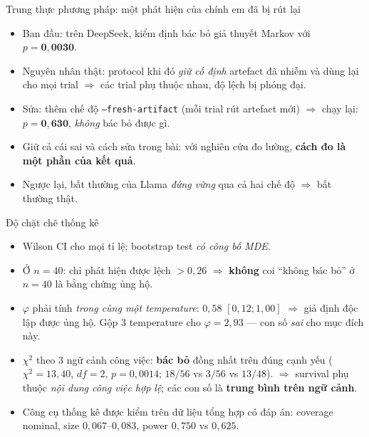 \documentclass[aspectratio=169,11pt]{beamer}
\begin{document}
\begin{frame}{Trung thực phương pháp: một phát hiện của chính em đã bị rút lại}
  \begin{itemize}
    \item Ban đầu: trên DeepSeek, kiểm định bác bỏ giả thuyết Markov với
          $p=\mathbf{0{,}0030}$.
    \item Nguyên nhân thật: protocol khi đó \emph{giữ cố định} artefact đã nhiễm và dùng
          lại cho mọi trial $\Rightarrow$ các trial phụ thuộc nhau, độ lệch bị phóng đại.
    \item Sửa: thêm chế độ \texttt{--fresh-artifact} (mỗi trial rút artefact mới)
          $\Rightarrow$ chạy lại: $p=\mathbf{0{,}630}$, \emph{không} bác bỏ được gì.
    \item Giữ cả cái sai và cách sửa trong bài: với nghiên cứu đo lường,
          \textbf{cách đo là một phần của kết quả}.
    \item Ngược lại, bất thường của Llama \emph{đứng vững} qua cả hai chế độ
          $\Rightarrow$ bất thường thật.
  \end{itemize}
\end{frame}

\begin{frame}{Độ chặt chẽ thống kê}
  \begin{itemize}
    \item Wilson CI cho mọi tỉ lệ; bootstrap test \emph{có công bố MDE}.
    \item Ở $n=40$: chỉ phát hiện được lệch $>0{,}26$ $\Rightarrow$ \textbf{không} coi
          ``không bác bỏ'' ở $n=40$ là bằng chứng ủng hộ.
    \item $\varphi$ phải tính \emph{trong cùng một temperature}: $0{,}58$ $[0{,}12;1{,}00]$
          $\Rightarrow$ giả định độc lập được ủng hộ. Gộp 3 temperature cho $\varphi=2{,}93$
          --- con số \emph{sai} cho mục đích này.
    \item $\chi^2$ theo 3 ngữ cảnh công việc: \textbf{bác bỏ} đồng nhất trên đúng cạnh
          yếu ($\chi^2=13{,}40$, $df=2$, $p=0{,}0014$; $18/56$ vs $3/56$ vs $13/48$).
          $\Rightarrow$ survival phụ thuộc \emph{nội dung công việc hợp lệ}; các con số là
          \textbf{trung bình trên ngữ cảnh}.
    \item Công cụ thống kê được kiểm trên dữ liệu tổng hợp có đáp án: coverage nominal,
          size $0{,}067$--$0{,}083$, power $0{,}750$ vs $0{,}625$.
  \end{itemize}
\end{frame}
\end{document}
